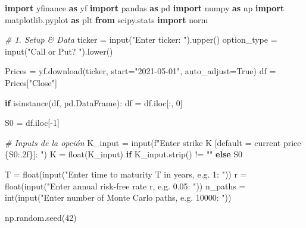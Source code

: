 \documentclass[
  11pt,
]{article}
\newenvironment{Shaded}{}{}
\newcommand{\BuiltInTok}[1]{\textcolor[rgb]{0.00,0.50,0.00}{#1}}
\newcommand{\CommentTok}[1]{\textcolor[rgb]{0.38,0.63,0.69}{\textit{#1}}}
\newcommand{\ControlFlowTok}[1]{\textcolor[rgb]{0.00,0.44,0.13}{\textbf{#1}}}
\newcommand{\DecValTok}[1]{\textcolor[rgb]{0.25,0.63,0.44}{#1}}
\newcommand{\ImportTok}[1]{\textcolor[rgb]{0.00,0.50,0.00}{\textbf{#1}}}
\newcommand{\NormalTok}[1]{#1}
\newcommand{\OperatorTok}[1]{\textcolor[rgb]{0.40,0.40,0.40}{#1}}
\newcommand{\SpecialCharTok}[1]{\textcolor[rgb]{0.25,0.44,0.63}{#1}}
\newcommand{\SpecialStringTok}[1]{\textcolor[rgb]{0.73,0.40,0.53}{#1}}
\newcommand{\StringTok}[1]{\textcolor[rgb]{0.25,0.44,0.63}{#1}}
\newcommand{\VariableTok}[1]{\textcolor[rgb]{0.10,0.09,0.49}{#1}}
\begin{document}
\begin{Shaded}
\begin{Highlighting}[]
\ImportTok{import}\NormalTok{ yfinance }\ImportTok{as}\NormalTok{ yf}
\ImportTok{import}\NormalTok{ pandas }\ImportTok{as}\NormalTok{ pd}
\ImportTok{import}\NormalTok{ numpy }\ImportTok{as}\NormalTok{ np}
\ImportTok{import}\NormalTok{ matplotlib.pyplot }\ImportTok{as}\NormalTok{ plt}
\ImportTok{from}\NormalTok{ scipy.stats }\ImportTok{import}\NormalTok{ norm}

\CommentTok{\# 1. Setup \& Data}
\NormalTok{ticker }\OperatorTok{=} \BuiltInTok{input}\NormalTok{(}\StringTok{"Enter ticker: "}\NormalTok{).upper()}
\NormalTok{option\_type }\OperatorTok{=} \BuiltInTok{input}\NormalTok{(}\StringTok{"Call or Put? "}\NormalTok{).lower()}

\NormalTok{Prices }\OperatorTok{=}\NormalTok{ yf.download(ticker, start}\OperatorTok{=}\StringTok{"2021{-}05{-}01"}\NormalTok{, auto\_adjust}\OperatorTok{=}\VariableTok{True}\NormalTok{)}
\NormalTok{df }\OperatorTok{=}\NormalTok{ Prices[}\StringTok{"Close"}\NormalTok{]}

\ControlFlowTok{if} \BuiltInTok{isinstance}\NormalTok{(df, pd.DataFrame):}
\NormalTok{    df }\OperatorTok{=}\NormalTok{ df.iloc[:, }\DecValTok{0}\NormalTok{]}

\NormalTok{S0 }\OperatorTok{=}\NormalTok{ df.iloc[}\OperatorTok{{-}}\DecValTok{1}\NormalTok{]}

\CommentTok{\# Inputs de la opción}
\NormalTok{K\_input }\OperatorTok{=} \BuiltInTok{input}\NormalTok{(}\SpecialStringTok{f"Enter strike K [default = current price }\SpecialCharTok{\{}\NormalTok{S0}\SpecialCharTok{:.2f\}}\SpecialStringTok{]: "}\NormalTok{)}
\NormalTok{K }\OperatorTok{=} \BuiltInTok{float}\NormalTok{(K\_input) }\ControlFlowTok{if}\NormalTok{ K\_input.strip() }\OperatorTok{!=} \StringTok{""} \ControlFlowTok{else}\NormalTok{ S0}

\NormalTok{T }\OperatorTok{=} \BuiltInTok{float}\NormalTok{(}\BuiltInTok{input}\NormalTok{(}\StringTok{"Enter time to maturity T in years, e.g. 1: "}\NormalTok{))}
\NormalTok{r }\OperatorTok{=} \BuiltInTok{float}\NormalTok{(}\BuiltInTok{input}\NormalTok{(}\StringTok{"Enter annual risk{-}free rate r, e.g. 0.05: "}\NormalTok{))}
\NormalTok{n\_paths }\OperatorTok{=} \BuiltInTok{int}\NormalTok{(}\BuiltInTok{input}\NormalTok{(}\StringTok{"Enter number of Monte Carlo paths, e.g. 10000: "}\NormalTok{))}

\NormalTok{np.random.seed(}\DecValTok{42}\NormalTok{)}


\end{Highlighting}
\end{Shaded}
\end{document}
